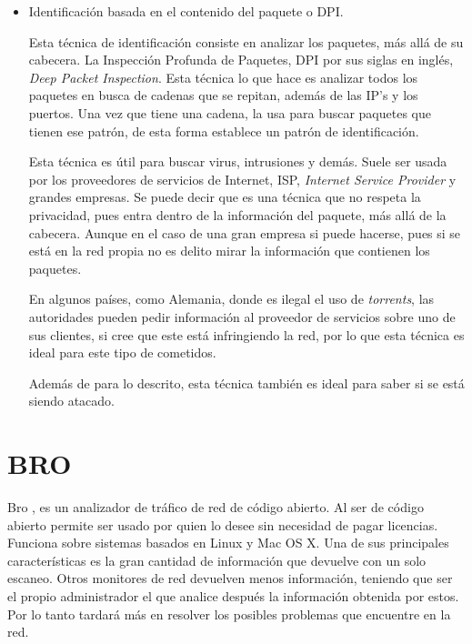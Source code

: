 \begin{itemize}

\item Identificación basada en el contenido del paquete o DPI. \cite{payload}

\intro Esta técnica de identificación consiste en analizar los paquetes, más allá de su cabecera. 
La Inspección Profunda de Paquetes, DPI por sus siglas en inglés, \textit{Deep Packet Inspection}. 
Esta técnica lo que hace es analizar todos los paquetes en busca de cadenas que se repitan, además 
de las IP's y los puertos. Una vez que tiene una cadena, la usa para buscar paquetes que tienen ese patrón, 
de esta forma establece un patrón de identificación.

\intro Esta técnica es útil para buscar virus, intrusiones y demás. Suele ser usada por los proveedores de 
servicios de Internet, ISP, \textit{Internet Service Provider} y grandes empresas. 
Se puede decir que es una técnica que no respeta la privacidad, pues entra dentro de la información del paquete, 
más allá de la cabecera. Aunque en el caso de una gran empresa si puede hacerse, pues si se está en la red propia 
no es delito mirar la información que contienen los paquetes. 

\intro En algunos países, como Alemania, donde es ilegal el uso de \textit{torrents}, 
las autoridades pueden pedir información al proveedor de servicios sobre uno de sus clientes, si cree que este 
está infringiendo la red, por lo que esta técnica es ideal para este tipo de cometidos.

\intro Además de para lo descrito, esta técnica también es ideal para saber si se está 
siendo atacado. \cite{dpiaproximacion}
\end{itemize}

\section{BRO}

Bro \cite{broindex}, es un analizador de tráfico de red de código abierto. Al ser de código abierto permite 
ser usado por quien lo desee sin necesidad de pagar licencias. Funciona sobre sistemas basados en Linux y 
Mac OS X. Una de sus principales características es la gran cantidad de información que devuelve con un solo 
escaneo. Otros monitores de red devuelven menos información, teniendo que ser el propio administrador el que 
analice después la información obtenida por estos. Por lo tanto tardará más en resolver los posibles problemas 
que encuentre en la red.

